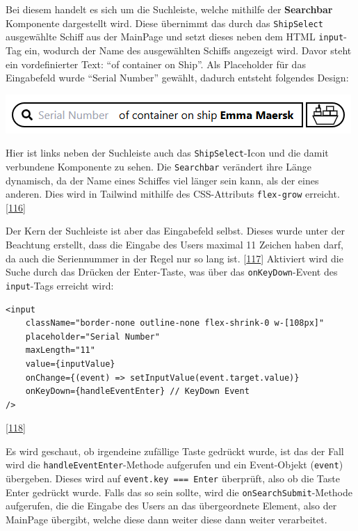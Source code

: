 \documentclass[
    headings=optiontotocandhead,%
    twoside,
    numbers=noenddot,%
    12pt, %
    titlepage, %
    parskip=full, %
    listof=leveldown, 
    numbers=noenddot, %
    a4paper,DIV=14,
    BCOR=15mm,
]{scrbook}
\newcommand{\passthrough}[1]{#1}
\let\origfigure=\figure
\let\endorigfigure=\endfigure
\renewenvironment{figure}[1][]{%
   \origfigure[H]
}{%
   \endorigfigure
}
\begin{document}
Bei diesem handelt es sich um die Suchleiste, welche mithilfe der
\textbf{Searchbar} Komponente dargestellt wird. Diese übernimmt das
durch das \passthrough{\lstinline!ShipSelect!} ausgewählte Schiff aus
der MainPage und setzt dieses neben dem HTML
\passthrough{\lstinline!input!}-Tag ein, wodurch der Name des
ausgewählten Schiffs angezeigt wird. Davor steht ein vordefinierter
Text: ``of container on Ship''. Als Placeholder für das Eingabefeld
wurde ``Serial Number'' gewählt, dadurch entsteht folgendes Design:

\begin{figure}
\centering
\includegraphics{img/Gekle/Searchbar.png}
\caption{Searchbar + ShipSelect Button}
\end{figure}

Hier ist links neben der Suchleiste auch das
\passthrough{\lstinline!ShipSelect!}-Icon und die damit verbundene
Komponente zu sehen. Die \passthrough{\lstinline!Searchbar!} verändert
ihre Länge dynamisch, da der Name eines Schiffes viel länger sein kann,
als der eines anderen. Dies wird in Tailwind mithilfe des CSS-Attributs
\passthrough{\lstinline!flex-grow!} erreicht.
{[}\protect\hyperlink{ref-TailwindCSS-Docs-FlexGrow}{116}{]}

Der Kern der Suchleiste ist aber das Eingabefeld selbst. Dieses wurde
unter der Beachtung erstellt, dass die Eingabe des Users maximal 11
Zeichen haben darf, da auch die Seriennummer in der Regel nur so lang
ist. {[}\protect\hyperlink{ref-ContainerBasis-Containernummern}{117}{]}
Aktiviert wird die Suche durch das Drücken der Enter-Taste, was über das
\passthrough{\lstinline!onKeyDown!}-Event des
\passthrough{\lstinline!input!}-Tags erreicht wird:

\begin{lstlisting}[caption={Inout Tag der Searchbar}]
<input
    className="border-none outline-none flex-shrink-0 w-[108px]"
    placeholder="Serial Number"
    maxLength="11"
    value={inputValue}
    onChange={(event) => setInputValue(event.target.value)}
    onKeyDown={handleEventEnter} // KeyDown Event
/>
\end{lstlisting}

{[}\protect\hyperlink{ref-Pluralsight-KeyboardEvents}{118}{]}

Es wird geschaut, ob irgendeine zufällige Taste gedrückt wurde, ist das
der Fall wird die \passthrough{\lstinline!handleEventEnter!}-Methode
aufgerufen und ein Event-Objekt (\passthrough{\lstinline!event!})
übergeben. Dieses wird auf \passthrough{\lstinline!event.key === Enter!}
überprüft, also ob die Taste Enter gedrückt wurde. Falls das so sein
sollte, wird die \passthrough{\lstinline!onSearchSubmit!}-Methode
aufgerufen, die die Eingabe des Users an das übergeordnete Element, also
der MainPage übergibt, welche diese dann weiter diese dann weiter
verarbeitet.
\end{document}
